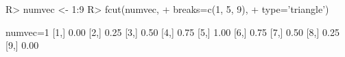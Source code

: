 \begin{Schunk}
% --begin: "fcut.numeric1"
\begin{Sinput}
R> numvec <- 1:9
R> fcut(numvec,
+       breaks=c(1, 5, 9),
+       type='triangle')
\end{Sinput}
\begin{Soutput}
      numvec=1
 [1,]     0.00
 [2,]     0.25
 [3,]     0.50
 [4,]     0.75
 [5,]     1.00
 [6,]     0.75
 [7,]     0.50
 [8,]     0.25
 [9,]     0.00
\end{Soutput}
%
% --end: "fcut.numeric1"
\end{Schunk}
